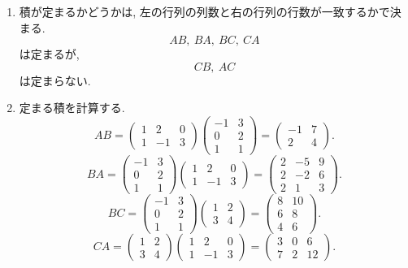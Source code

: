 \documentclass[dvipdfmx,a4paper,11pt]{article} %
\theoremstyle{definition}
\begin{document}
\begin{enumerate}[label=(\arabic*)]
\item
積が定まるかどうかは, 左の行列の列数と右の行列の行数が一致するかで決まる.
\[
AB,\ BA,\ BC,\ CA
\]
は定まるが,
\[
\boxed{CB,\ AC}
\]
は定まらない.

\item
定まる積を計算する.
\[
AB
=
\begin{pmatrix}
1&2&0\\
1&-1&3
\end{pmatrix}
\begin{pmatrix}
-1&3\\
0&2\\
1&1
\end{pmatrix}
=
\begin{pmatrix}
-1&7\\
2&4
\end{pmatrix}.
\]
\[
BA
=
\begin{pmatrix}
-1&3\\
0&2\\
1&1
\end{pmatrix}
\begin{pmatrix}
1&2&0\\
1&-1&3
\end{pmatrix}
=
\begin{pmatrix}
2&-5&9\\
2&-2&6\\
2&1&3
\end{pmatrix}.
\]
\[
BC
=
\begin{pmatrix}
-1&3\\
0&2\\
1&1
\end{pmatrix}
\begin{pmatrix}
1&2\\
3&4
\end{pmatrix}
=
\begin{pmatrix}
8&10\\
6&8\\
4&6
\end{pmatrix}.
\]
\[
CA
=
\begin{pmatrix}
1&2\\
3&4
\end{pmatrix}
\begin{pmatrix}
1&2&0\\
1&-1&3
\end{pmatrix}
=
\begin{pmatrix}
3&0&6\\
7&2&12
\end{pmatrix}.
\]
\end{enumerate}
\end{document}
